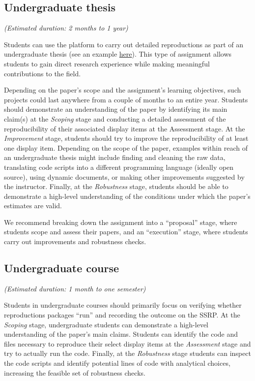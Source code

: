 \documentclass[
  openany]{book}
\begin{document}
\hypertarget{undergraduate-thesis}{%
\subsection{Undergraduate thesis}\label{undergraduate-thesis}}

\emph{(Estimated duration: 2 months to 1 year)}

Students can use the platform to carry out detailed reproductions as part of an undergraduate thesis (see an example \href{https://osf.io/3e6ps/}{here}). This type of assignment allows students to gain direct research experience while making meaningful contributions to the field.

Depending on the paper's scope and the assignment's learning objectives, such projects could last anywhere from a couple of months to an entire year. Students should demonstrate an understanding of the paper by identifying its main claim(s) at the \emph{Scoping} stage and conducting a detailed assessment of the reproducibility of their associated display items at the Assessment stage. At the \emph{Improvement} stage, students should try to improve the reproducibility of at least one display item. Depending on the scope of the paper, examples within reach of an undergraduate thesis might include finding and cleaning the raw data, translating code scripts into a different programming language (ideally open source), using dynamic documents, or making other improvements suggested by the instructor. Finally, at the \emph{Robustness} stage, students should be able to demonstrate a high-level understanding of the conditions under which the paper's estimates are valid.

We recommend breaking down the assignment into a ``proposal'' stage, where students scope and assess their papers, and an ``execution'' stage, where students carry out improvements and robustness checks.

\hypertarget{undergraduate-course}{%
\subsection{Undergraduate course}\label{undergraduate-course}}

\emph{(Estimated duration: 1 month to one semester)}

Students in undergraduate courses should primarily focus on verifying whether reproductions packages ``run'' and recording the outcome on the SSRP. At the \emph{Scoping} stage, undergraduate students can demonstrate a high-level understanding of the paper's main claims. Students can identify the code and files necessary to reproduce their select display items at the \emph{Assessment} stage and try to actually run the code. Finally, at the \emph{Robustness} stage students can inspect the code scripts and identify potential lines of code with analytical choices, increasing the feasible set of robustness checks.
\end{document}
